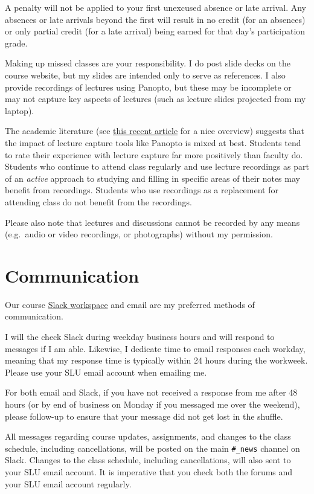 \documentclass[
]{book}
\begin{document}
A penalty will not be applied to your first unexcused absence or late arrival. Any absences or late arrivals beyond the first will result in no credit (for an absences) or only partial credit (for a late arrival) being earned for that day's participation grade.

Making up missed classes are your responsibility. I do post slide decks on the course website, but my slides are intended only to serve as references. I also provide recordings of lectures using Panopto, but these may be incomplete or may not capture key aspects of lectures (such as lecture slides projected from my laptop).

The academic literature (see \href{https://link.springer.com/article/10.1007/s10734-018-0275-9}{this recent article} for a nice overview) suggests that the impact of lecture capture tools like Panopto is mixed at best. Students tend to rate their experience with lecture capture far more positively than faculty do. Students who continue to attend class regularly and use lecture recordings as part of an \emph{active} approach to studying and filling in specific areas of their notes may benefit from recordings. Students who use recordings as a replacement for attending class do not benefit from the recordings.

Please also note that lectures and discussions cannot be recorded by any means (e.g.~audio or video recordings, or photographs) without my permission.

\hypertarget{communication}{%
\section{Communication}\label{communication}}

Our course \href{http://slu-soc5650.slack.com}{Slack workspace} and email are my preferred methods of communication.

I will the check Slack during weekday business hours and will respond to messages if I am able. Likewise, I dedicate time to email responses each workday, meaning that my response time is typically within 24 hours during the workweek. Please use your SLU email account when emailing me.

For both email and Slack, if you have not received a response from me after 48 hours (or by end of business on Monday if you messaged me over the weekend), please follow-up to ensure that your message did not get lost in the shuffle.

All messages regarding course updates, assignments, and changes to the class schedule, including cancellations, will be posted on the main \texttt{\#\_news} channel on Slack. Changes to the class schedule, including cancellations, will also sent to your SLU email account. It is imperative that you check both the forums and your SLU email account regularly.
\end{document}
